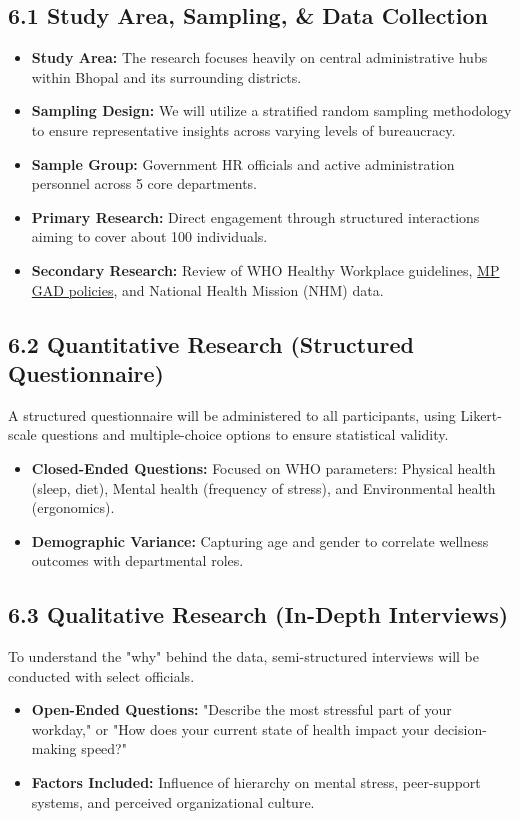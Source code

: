 \documentclass[11pt,a4paper]{article}
\begin{document}
\subsection{6.1 Study Area, Sampling, \& Data Collection}
\begin{itemize}
    \item \textbf{Study Area:} The research focuses heavily on central administrative hubs within Bhopal and its surrounding districts.
    \item \textbf{Sampling Design:} We will utilize a stratified random sampling methodology to ensure representative insights across varying levels of bureaucracy.
    \item \textbf{Sample Group:} Government HR officials and active administration personnel across 5 core departments.
    \item \textbf{Primary Research:} Direct engagement through structured interactions aiming to cover about 100 individuals.
    \item \textbf{Secondary Research:} Review of WHO Healthy Workplace guidelines, \href{https://gad.mp.gov.in/}{MP GAD policies}, and National Health Mission (NHM) data.
\end{itemize}

\subsection{6.2 Quantitative Research (Structured Questionnaire)}
A structured questionnaire will be administered to all participants, using Likert-scale questions and multiple-choice options to ensure statistical validity.
\begin{itemize}
    \item \textbf{Closed-Ended Questions:} Focused on WHO parameters: Physical health (sleep, diet), Mental health (frequency of stress), and Environmental health (ergonomics).
    \item \textbf{Demographic Variance:} Capturing age and gender to correlate wellness outcomes with departmental roles.
\end{itemize}

\subsection{6.3 Qualitative Research (In-Depth Interviews)}
To understand the "why" behind the data, semi-structured interviews will be conducted with select officials.
\begin{itemize}
    \item \textbf{Open-Ended Questions:} "Describe the most stressful part of your workday," or "How does your current state of health impact your decision-making speed?"
    \item \textbf{Factors Included:} Influence of hierarchy on mental stress, peer-support systems, and perceived organizational culture.
\end{itemize}
\end{document}

